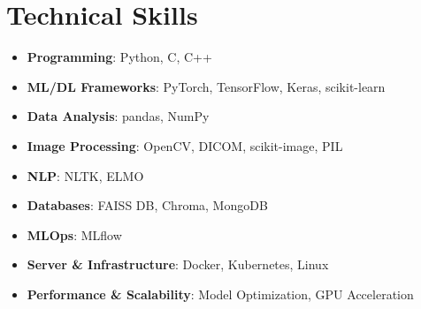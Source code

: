 \section{\textbf{Technical Skills}}
\begin{itemize}
    \small
    \setlength{\itemsep}{0pt}
    \setlength{\parskip}{0pt}
    \setlength{\parsep}{0pt}
    \item \textbf{Programming}: Python, C, C++ 
    \item \textbf{ML/DL Frameworks}: PyTorch, TensorFlow, Keras, scikit-learn
    \item \textbf{Data Analysis}: pandas, NumPy
    \item \textbf{Image Processing}: OpenCV, DICOM, scikit-image, PIL
    \item \textbf{NLP}: NLTK, ELMO
    \item \textbf{Databases}: FAISS DB, Chroma, MongoDB 
    \item \textbf{MLOps}: MLflow
    \item \textbf{Server \& Infrastructure}: Docker, Kubernetes, Linux
    \item \textbf{Performance \& Scalability}: Model Optimization, GPU Acceleration
\end{itemize}